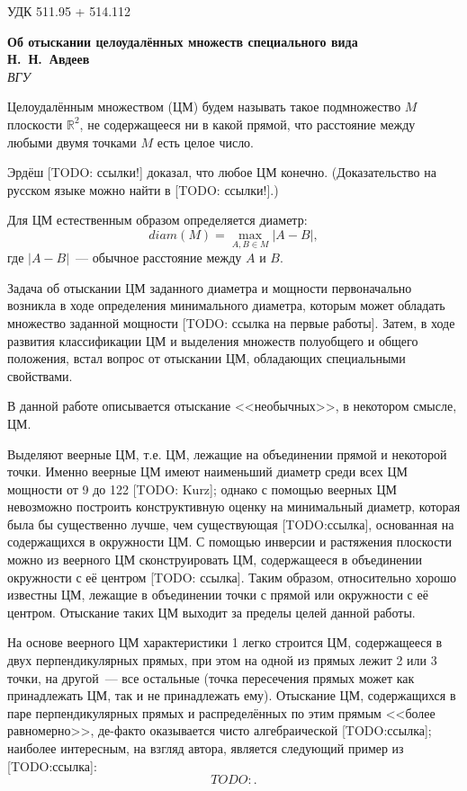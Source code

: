 \documentclass[12pt]{article}
\begin{document}
\noindent УДК 511.95 + 514.112

\begin{center}
\textbf{Об отыскании целоудалённых множеств специального вида} \\[3mm]
\textbf{Н.~Н.~Авдеев}\\[2mm]
\emph{ВГУ}
\end{center}

Целоудалённым множеством (ЦМ) будем называть такое подмножество $M$ плоскости $\mathbb{R}^2$,
не содержащееся ни в какой прямой,
что расстояние между любыми двумя точками $M$ есть целое число.

Эрдёш [TODO: ссылки!] доказал, что любое ЦМ конечно.
(Доказательство на русском языке можно найти в [TODO: ссылки!].)

Для ЦМ естественным образом определяется диаметр:
$$
	diam(M) = \max_{A,B\in M} |A-B|,
$$
где $|A-B|$~--- обычное расстояние между $A$ и $B$.

Задача об отыскании ЦМ заданного диаметра и мощности первоначально возникла
в ходе определения минимального диаметра,
которым может обладать множество заданной мощности [TODO: ссылка на первые работы].
Затем, в ходе развития классификации ЦМ и выделения множеств полуобщего и общего положения,
встал вопрос от отыскании ЦМ, обладающих специальными свойствами.


В данной работе описывается отыскание <<необычных>>, в некотором смысле, ЦМ.

Выделяют веерные ЦМ, т.е. ЦМ, лежащие на объединении прямой и некоторой точки.
Именно веерные ЦМ имеют наименьший диаметр среди всех ЦМ мощности от 9 до 122 [TODO: Kurz];
однако с помощью веерных ЦМ невозможно построить конструктивную оценку на минимальный диаметр,
которая была бы существенно лучше, чем существующая [TODO:ссылка], основанная на содержащихся в окружности ЦМ.
С помощью инверсии и растяжения плоскости можно из веерного ЦМ сконструировать ЦМ,
содержащееся в объединении окружности с её центром [TODO: ссылка].
Таким образом, относительно хорошо известны ЦМ, лежащие в объединении точки с прямой или окружности с её центром.
Отыскание таких ЦМ выходит за пределы целей данной работы.

На основе веерного ЦМ характеристики 1 легко строится ЦМ, содержащееся в двух перпендикулярных прямых,
при этом на одной из прямых лежит 2 или 3 точки, на другой~--- все остальные
(точка пересечения прямых может как принадлежать ЦМ, так и не принадлежать ему).
Отыскание ЦМ, содержащихся в паре перпендикулярных прямых и распределённых по этим прямым
<<более равномерно>>, де-факто оказывается чисто алгебраической [TODO:ссылка];
наиболее интересным, на взгляд автора, является следующий пример из [TODO:ссылка]:
$$
TODO:
.
$$
\end{document}
